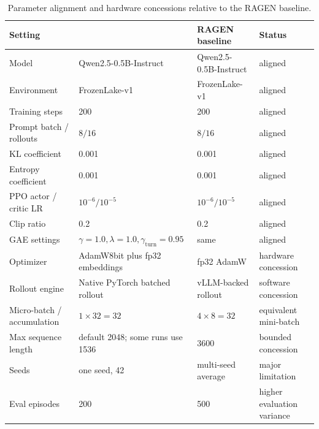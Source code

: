 \begin{table}[!htbp]
\centering
\small
\begin{tabularx}{\textwidth}{lXXX}
\toprule
Setting & \method{} & RAGEN baseline & Status \\
\midrule
Model & Qwen2.5-0.5B-Instruct & Qwen2.5-0.5B-Instruct & aligned \\
Environment & FrozenLake-v1 & FrozenLake-v1 & aligned \\
Training steps & 200 & 200 & aligned \\
Prompt batch / rollouts & \(8 / 16\) & \(8 / 16\) & aligned \\
KL coefficient & 0.001 & 0.001 & aligned \\
Entropy coefficient & 0.001 & 0.001 & aligned \\
PPO actor / critic LR & \(10^{-6} / 10^{-5}\) & \(10^{-6} / 10^{-5}\) & aligned \\
Clip ratio & 0.2 & 0.2 & aligned \\
GAE settings & \(\gamma=1.0,\lambda=1.0,\gamma_{\mathrm{turn}}=0.95\) & same & aligned \\
Optimizer & AdamW8bit plus fp32 embeddings & fp32 AdamW & hardware concession \\
Rollout engine & Native PyTorch batched rollout & vLLM-backed rollout & software concession \\
Micro-batch / accumulation & \(1 \times 32 = 32\) & \(4 \times 8 = 32\) & equivalent mini-batch \\
Max sequence length & default 2048; some runs use 1536 & 3600 & bounded concession \\
Seeds & one seed, 42 & multi-seed average & major limitation \\
Eval episodes & 200 & 500 & higher evaluation variance \\
\bottomrule
\end{tabularx}
\caption{Parameter alignment and hardware concessions relative to the RAGEN baseline.}
\label{tab:app_alignment}
\end{table}


